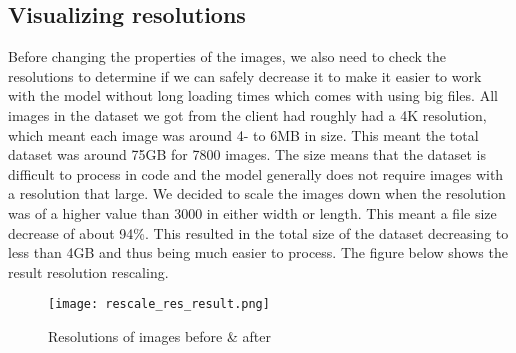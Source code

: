 \subsection{Visualizing resolutions}
\begin{fullwidth} %
Before changing the properties of the images, 
we also need to check the resolutions to determine if we can safely decrease it to make it easier to work with the model without long loading times which comes with using big files. 
All images in the dataset we got from the client had roughly had a 4K resolution, which meant each image was around 4- to 6MB in size. 
This meant the total dataset was around 75GB for 7800 images. 
The size means that the dataset is difficult to process in code and the model generally does not require images with a resolution that large. 
We decided to scale the images down when the resolution was of a higher value than 3000 in either width or length. 
This meant a file size decrease of about 94\%. 
This resulted in the total size of the dataset decreasing to less than 4GB and thus being much easier to process. 
The figure below shows the result resolution rescaling.
\end{fullwidth} %

\begin{figure}[H] %
	\texttt{[image: rescale\_res\_result.png]}
	\caption{Resolutions of images before \& after}
	\label{fig:rescale_res_result} %
\end{figure}


